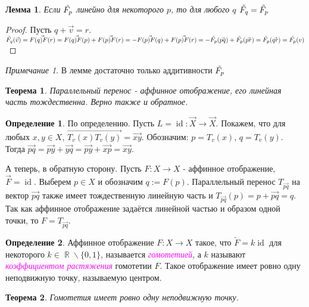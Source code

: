 \documentclass[a4paper,100pt]{article}
\theoremstyle{indented}
\newtheorem{theorem}{Теорема}
\newtheorem{lemma}{Лемма}
\theoremstyle{definition}
\newtheorem{defn}{Определение}
\theoremstyle{remark}
\newtheorem{remark}{Примечание}
\DeclareMathOperator{\ra}{\rightarrow}
\DeclareMathOperator{\id}{id}
\DeclareMathOperator{\RR}{\mathbb{R}}
\begin{document}
\begin{lemma}
    Если $\Tilde{F_p} $ линейно для некоторого $p$, то для любого $q$ $\Tilde{F_q}=\Tilde{F_p}$
\end{lemma}

\begin{proof}
    Пусть $q+\vec{v}=r$. $\Tilde{F_q}(\vec{v})=\vec{F(q)F(r)}=\vec{F(q)F(p)}+\vec{F(p)F(r)}=-\vec{F(p)F(q)}+\vec{F(p)F(r)}=-\Tilde{F_p}(\vec{pq})+\Tilde{F_p}(\vec{pr})=\Tilde{F_p}(\vec{qr})=\Tilde{F_p}(v)$
\end{proof}

\begin{remark}
    В лемме достаточно только аддитивности $\Tilde{F_p}$
\end{remark}

\begin{theorem}
    Параллельный перенос - аффинное отображение, его линейная часть тождественна. Верно также и обратное.
\end{theorem}

\begin{defn}
    По определению. Пусть $L = \id: \vec{X} \ra \vec{X}$.  Покажем, что для любых $x, y \in X$, $\overrightarrow{T_v(x) T_v(y)} = \overrightarrow{xy}$. Обозначим: $p = T_v(x)$, $q = T_v(y)$. Тогда $\overrightarrow{pq} = \overrightarrow{py}+ \overrightarrow{yq} = \overrightarrow{py} + \overrightarrow{xp} = \overrightarrow{xy}$. \ 

    А теперь, в обратную сторону. Пусть $F: X \ra X$ - аффинное отображение, $\overrightarrow{F} = \id$. Выберем $p \in X$ и обозначим $q := F(p)$. Параллельный перенос $T_{\overrightarrow{pq}}$ на вектор $\overrightarrow{pq}$ также имеет тождественную линейную часть и $T_{\overrightarrow{pq}}(p) = p + \overrightarrow{pq} = q$. Так как аффинное отображение задаётся линейной частью и образом одной точки, то $F = T_{\overrightarrow{pq}}$.
\end{defn}

\begin{defn}
    Аффинное отображение $F:X\ra X$ такое, что $\tilde{F}=k \id$ для некоторого $k \in \RR\backslash \{0, 1\}$, называется \textit{\textcolor{magenta}{\hypertarget{s29}{гомотетией}}}, а $k$ называют \textit{\textcolor{magenta}{\hypertarget{s30}{коэффициентом растяжения}}} гомотетии $F$. Такое отображение имеет ровно одну неподвижную точку, называемую центром.
\end{defn}

\begin{theorem}
    Гомотетия имеет ровно одну неподвижную точку.
\end{theorem}
\end{document}
